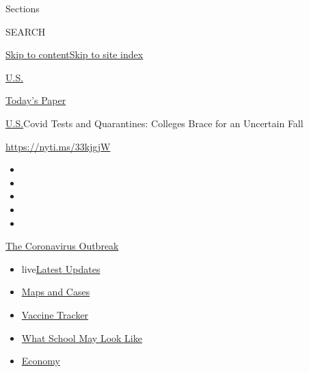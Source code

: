 Sections

SEARCH

\protect\hyperlink{site-content}{Skip to
content}\protect\hyperlink{site-index}{Skip to site index}

\href{https://www.nytimes3xbfgragh.onion/section/us}{U.S.}

\href{https://myaccount.nytimes3xbfgragh.onion/auth/login?response_type=cookie\&client_id=vi}{}

\href{https://www.nytimes3xbfgragh.onion/section/todayspaper}{Today's
Paper}

\href{/section/us}{U.S.}\textbar{}Covid Tests and Quarantines: Colleges
Brace for an Uncertain Fall

\url{https://nyti.ms/33kjgjW}

\begin{itemize}
\item
\item
\item
\item
\item
\end{itemize}

\href{https://www.nytimes3xbfgragh.onion/news-event/coronavirus?action=click\&pgtype=Article\&state=default\&region=TOP_BANNER\&context=storylines_menu}{The
Coronavirus Outbreak}

\begin{itemize}
\tightlist
\item
  live\href{https://www.nytimes3xbfgragh.onion/2020/08/02/world/coronavirus-updates.html?action=click\&pgtype=Article\&state=default\&region=TOP_BANNER\&context=storylines_menu}{Latest
  Updates}
\item
  \href{https://www.nytimes3xbfgragh.onion/interactive/2020/us/coronavirus-us-cases.html?action=click\&pgtype=Article\&state=default\&region=TOP_BANNER\&context=storylines_menu}{Maps
  and Cases}
\item
  \href{https://www.nytimes3xbfgragh.onion/interactive/2020/science/coronavirus-vaccine-tracker.html?action=click\&pgtype=Article\&state=default\&region=TOP_BANNER\&context=storylines_menu}{Vaccine
  Tracker}
\item
  \href{https://www.nytimes3xbfgragh.onion/interactive/2020/07/29/us/schools-reopening-coronavirus.html?action=click\&pgtype=Article\&state=default\&region=TOP_BANNER\&context=storylines_menu}{What
  School May Look Like}
\item
  \href{https://www.nytimes3xbfgragh.onion/live/2020/07/31/business/stock-market-today-coronavirus?action=click\&pgtype=Article\&state=default\&region=TOP_BANNER\&context=storylines_menu}{Economy}
\end{itemize}

